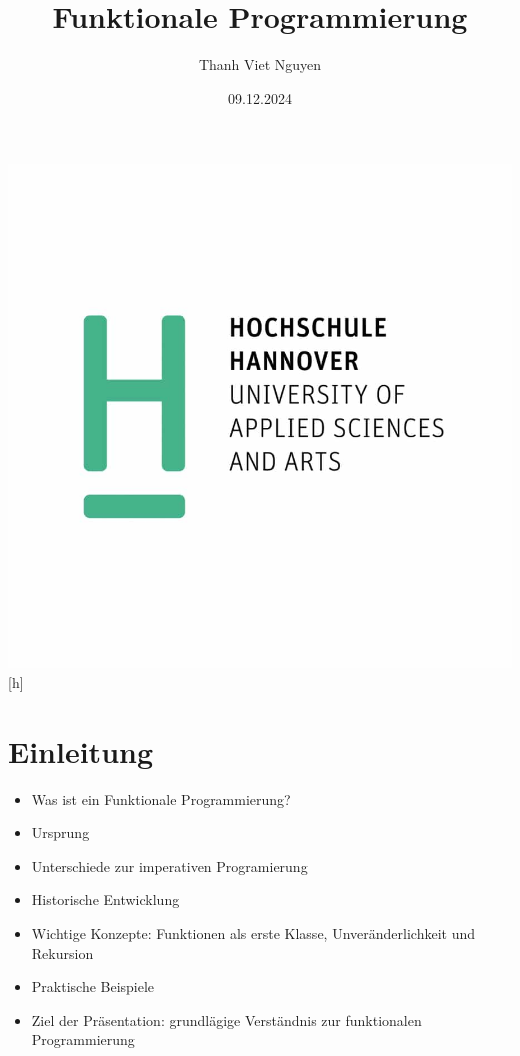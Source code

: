 \documentclass{beamer}
\title{Funktionale Programmierung}
\author{Thanh Viet Nguyen}
\begin{document}
\begin{frame}%
    \maketitle
    \centering
   \includegraphics[scale=0.15]{bilder/hsh-logo.jpg}[h]
   \date{09.12.2024}
\end{frame}

\begin{frame}
	\tableofcontents
\end{frame}


\section{Einleitung}
\begin{frame}
\begin{itemize}
\item Was ist ein Funktionale Programmierung?
\item Ursprung
\item Unterschiede zur imperativen Programierung
\item Historische Entwicklung
\item Wichtige Konzepte: Funktionen als erste Klasse, Unveränderlichkeit und Rekursion
\item Praktische Beispiele
\item Ziel der Präsentation: grundlägige Verständnis  zur funktionalen Programmierung
\end{itemize}
\end{frame}
\end{document}
